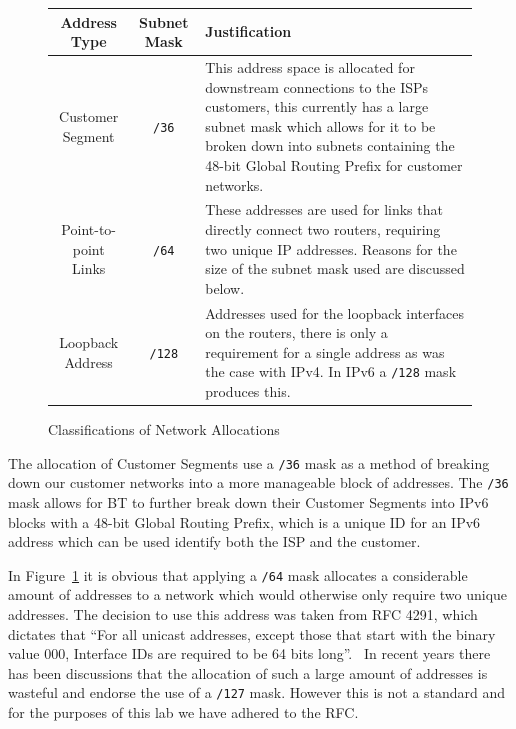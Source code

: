 \begin{figure}[!ht]
    \caption{Classifications of Network Allocations}
    \label{figure:network-alloc-3}
    \centering
    \begin{tabular}{|c|c|p{5.5cm}|}

        \hline \textbf{Address Type} & \textbf{Subnet Mask} &
        \textbf{Justification} \\

        \hline
        Customer Segment & \texttt{/36} & This address space is allocated for
downstream connections to the ISPs customers, this currently has a large subnet
mask which allows for it to be broken down into subnets containing the 48-bit
Global Routing Prefix for customer networks.\\

        \hline
        Point-to-point Links & \texttt{/64} & These addresses
are used for links that directly connect two routers, requiring two unique IP
addresses. Reasons for the size of the subnet mask used are discussed below.\\

        \hline
        Loopback Address & \texttt{/128} & Addresses used for the loopback
interfaces on the routers, there is only a requirement for a single address as
was the case with IPv4. In IPv6 a \texttt{/128} mask produces this.\\

		\hline
    \end{tabular}
\end{figure}

The allocation of Customer Segments use a \texttt{/36} mask as a method of
breaking down our customer networks into a more manageable block of addresses.
The \texttt{/36} mask allows for BT to further break down their Customer
Segments into IPv6 blocks with a 48-bit Global Routing Prefix, which is a
unique ID for an IPv6 address which can be used identify both the ISP and the
customer.

In Figure~\ref{figure:network-alloc-3} it is obvious that applying a
\texttt{/64} mask allocates a considerable amount of addresses to a network
which would otherwise only require two unique addresses. The decision to use
this address was taken from RFC 4291, which dictates that ``For all unicast
addresses, except those that start with the binary value 000, Interface IDs are
required to be 64 bits long''.~\cite{rfc4291} In recent years there has been
discussions that the allocation of such a large amount of addresses is wasteful
and endorse the use of a \texttt{/127} mask. However this is not a standard and
for the purposes of this lab we have adhered to the RFC.
